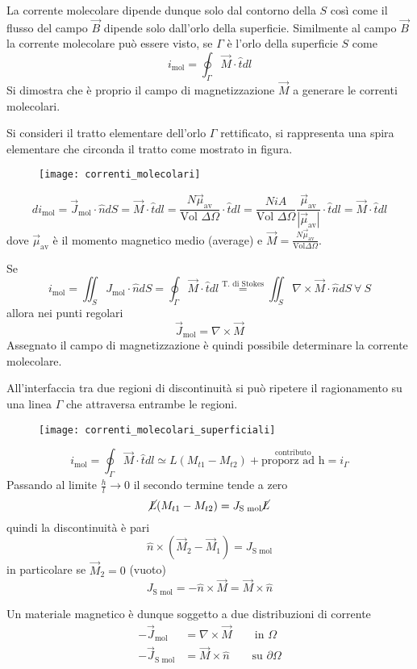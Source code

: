 La corrente molecolare dipende dunque solo dal contorno della $S$ così come il flusso
del campo $\vec{B}$ dipende solo dall'orlo della superficie. Similmente al campo $\vec{B}$
la corrente molecolare può essere visto, se $\Gamma$ è l'orlo della superficie $S$ come
$$
i_{\text{mol}} = \oint_\Gamma \vec{M}\cdot\hat{t} dl 
$$
Si dimostra che è proprio il campo di magnetizzazione $\vec{M}$ a generare le correnti
molecolari.

Si consideri il tratto elementare dell'orlo $\Gamma$ rettificato, si rappresenta una 
spira elementare che circonda il tratto come mostrato in figura.
\begin{figure}[H]
\centering
\texttt{[image: correnti\_molecolari]}
\end{figure}

$$
d i_\text{mol} = \vec{J}_\text{mol}\cdot\hat{n} dS = \vec{M}\cdot\hat{t}dl = \frac{N \vec{\mu}_\text{av}}{\text{Vol }\Delta \Omega } \cdot \hat{t} dl = \frac{N i A}{\text{Vol }\Delta\Omega} \frac{\vec{\mu}_\text{av}}{|\vec{\mu}_\text{av}|}\cdot \hat{t}dl = \vec{M}\cdot\hat{t}dl
$$
dove $\vec{\mu}_\text{av}$ è il momento magnetico medio (average) e $\vec{M} = \frac{N\vec{\mu}_\text{av}}{\text{Vol}\Delta\Omega}$.

Se 
$$
i_\text{mol} = \iint_S J_\text{mol} \cdot\hat{n} dS = \oint_\Gamma \vec{M}\cdot\hat{t}dl \stackrel{\text{T. di Stokes}}{=} \iint_S \nabla\times\vec{M}\cdot\hat{n} dS \ \forall \ S
$$
allora nei punti regolari
$$
\vec{J}_\text{mol} = \nabla\times\vec{M}
$$
Assegnato il campo di magnetizzazione è quindi possibile determinare la corrente 
molecolare.

All'interfaccia tra due regioni di discontinuità si può ripetere il ragionamento su una
linea $\Gamma$ che attraversa entrambe le regioni.
\begin{figure}[H]
\centering
\texttt{[image: correnti\_molecolari\_superficiali]}
\end{figure}
$$
i_\text{mol} = \oint_\Gamma \vec{M}\cdot\hat{t}dl \simeq L(M_{t1} - M_{t2}) + \stackrel{\text{contributo}}{\text{proporz ad h}} = i_\Gamma 
$$
Passando al limite $\frac{h}{l}\to 0 $ il secondo termine tende a zero
$$
\cancel{L}(M_{t1} - M_{t2}) = J_\text{S mol} \cancel{L}
$$
quindi la discontinuità è pari
$$
\hat{n}\times(\vec{M}_2 - \vec{M}_1) = J_\text{S mol}
$$
in particolare se $\vec{M}_2 = 0$ (vuoto)
$$
J_\text{S mol} = -\hat{n}\times\vec{M} = \vec{M}\times\hat{n}
$$

Un materiale magnetico è dunque soggetto a due distribuzioni di corrente
\begin{align*}
-\vec{J}_\text{mol} &= \nabla\times\vec{M} \qquad \text{in }\Omega \\
-\vec{J}_\text{S mol} &= \vec{M}\times\hat{n} \qquad \text{su } \partial\Omega
\end{align*}

